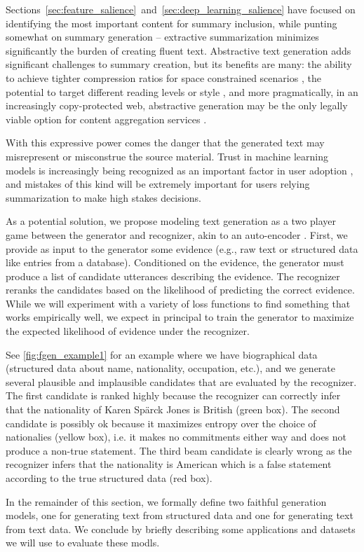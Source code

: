 Sections~\ref{sec:feature_salience}~and~\ref{sec:deep_learning_salience}
have focused on identifying the most important content for summary inclusion,
while punting somewhat on summary generation -- extractive summarization 
minimizes significantly the burden of creating fluent text. 
Abstractive text generation adds significant challenges to summary creation, 
but its benefits are many: the ability to achieve tighter compression ratios
for space constrained scenarios \citep{fan2017controllable}, the potential
to target different reading levels \citep{margarido2008automatic}
or style \citep{shen2017style}, and more pragmatically, in
an increasingly copy-protected web, abstractive generation may be the only 
legally viable option for content aggregation services 
\citep{kassam2014google}.

With this expressive power comes the danger that the generated text may
misrepresent or misconstrue the source material. Trust in machine learning
models is increasingly being recognized as an important factor in user 
adoption \citep{ribeiro2016should}, and mistakes of this kind will be extremely
important for users relying summarization to make high stakes decisions.



As a potential solution,
we propose modeling text generation as a two player game between the generator
and recognizer, akin to an auto-encoder \citep{rumelhart1985learning}. 
First, we provide as input to the 
generator some evidence (e.g., raw text or structured data like entries 
from a database). Conditioned on the evidence, the generator must produce 
a list of candidate utterances describing the evidence. The recognizer
reranks the candidates based on the likelihood of predicting the 
correct evidence.
While we will experiment with a variety of loss functions to find something
that works empirically well, we expect in principal to train the generator
to maximize the expected likelihood of evidence under the recognizer.




See \autoref{fig:fgen_example1} for an example 
where we have biographical data (structured data about name, nationality, 
occupation, etc.), and we generate several plausible and implausible 
candidates that are evaluated by the recognizer.
The first candidate is 
 ranked highly because the recognizer can correctly infer that the 
 nationality of Karen Sp\"arck Jones is British (green box). The second 
 candidate is possibly ok because it maximizes entropy over the choice 
 of nationalies (yellow box), i.e. it makes no commitments either way and does
 not produce a non-true statement. The third beam candidate is clearly wrong
 as the recognizer infers that the nationality is American which is a false
 statement according to the true structured data (red box).

In the remainder of this section, we formally define two faithful generation
models, one for generating text from structured data and 
one for generating text from  text data. We conclude by briefly describing some
applications and datasets we will use to evaluate these modls.
